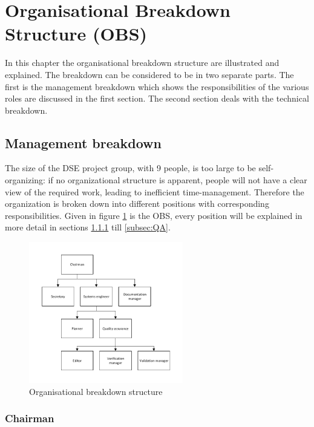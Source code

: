 \section{Organisational Breakdown Structure (OBS)}\label{cha:OBS}
In this chapter the organisational breakdown structure are illustrated and explained. The breakdown can be considered to be in two separate parts. The first is the management breakdown which shows the responsibilities of the various roles are discussed in the first section. The second section deals with the technical breakdown.

\subsection{Management breakdown}
The size of the DSE project group, with 9 people, is too large to be self-organizing: if no organizational structure is apparent, people will not have a clear view of the required work, leading to inefficient time-management. Therefore the organization is broken down into different positions with corresponding responsibilities. Given in figure \ref{fig:OBS} is the OBS, every position will be explained in more detail in sections \ref{subsec:Chairman} till \ref{subsec:QA}.

\begin{figure}[h]
\centering
\includegraphics[width=0.6\textwidth]{./Figure/OBS.pdf}
\caption{Organisational breakdown structure} \label{fig:OBS}
\end{figure}

\subsubsection{Chairman}\label{subsec:Chairman}


